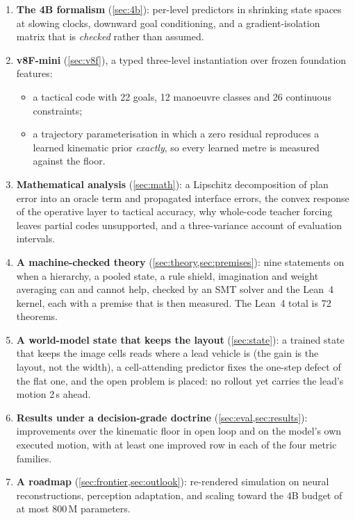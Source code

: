 \documentclass[10pt,twocolumn]{article}
\makeatletter
\theoremstyle{remark}
\renewcommand\paragraph{\@startsection{paragraph}{4}{\z@}{1.6ex \@plus .5ex \@minus .2ex}{-1em}{\normalfont\normalsize\bfseries}}
\makeatother
\begin{document}
\paragraph{Contributions.}
\begin{enumerate}[label=(\roman*)]
  \item \textbf{The 4B formalism} (\cref{sec:4b}): per-level predictors in shrinking state spaces at slowing clocks, downward goal
        conditioning, and a gradient-isolation matrix that is \emph{checked} rather than assumed.
  \item \textbf{v8F-mini} (\cref{sec:v8f}), a typed three-level instantiation over frozen foundation features:
        \begin{itemize}
          \item a tactical code with 22 goals, 12 manoeuvre classes and 26 continuous constraints;
          \item a trajectory parameterisation in which a zero residual reproduces a learned kinematic prior \emph{exactly}, so every
                learned metre is measured against the floor.
        \end{itemize}
  \item \textbf{Mathematical analysis} (\cref{sec:math}): a Lipschitz decomposition of plan error into an oracle term and propagated
        interface errors, the convex response of the operative layer to tactical accuracy, why whole-code teacher forcing leaves
        partial codes unsupported, and a three-variance account of evaluation intervals.
  \item \textbf{A machine-checked theory} (\cref{sec:theory,sec:premises}): nine statements on when a hierarchy, a pooled state, a
        rule shield, imagination and weight averaging can and cannot help, checked by an SMT solver and the Lean~4 kernel, each
        with a premise that is then measured. The Lean~4 total is 72 theorems.
  \item \textbf{A world-model state that keeps the layout} (\cref{sec:state}): a trained state that keeps the image cells reads
        where a lead vehicle is (the gain is the layout, not the width), a cell-attending predictor fixes the one-step defect of
        the flat one, and the open problem is placed: no rollout yet carries the lead's motion 2\,s ahead.
  \item \textbf{Results under a decision-grade doctrine} (\cref{sec:eval,sec:results}): improvements over the kinematic floor in open
        loop and on the model's own executed motion, with at least one improved row in each of the four metric families.
  \item \textbf{A roadmap} (\cref{sec:frontier,sec:outlook}): re-rendered simulation on neural reconstructions, perception adaptation,
        and scaling toward the 4B budget of at most 800\,M parameters.
\end{enumerate}
\end{document}

